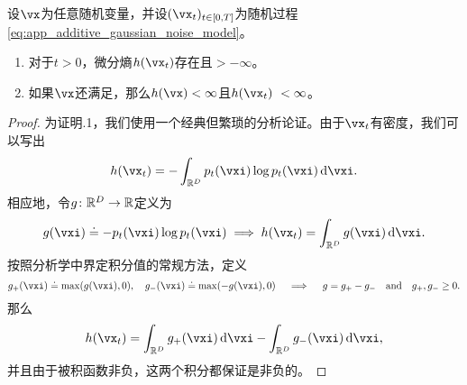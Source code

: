 \documentclass[../../book-main.tex]{subfiles}
\begin{document}
\begin{lemma}\label{lem:diffusion_entropy_exists}
    设\(\vx\)为任意随机变量，并设\((\vx_{t})_{t \in [0, T]}\)为随机过程\eqref{eq:app_additive_gaussian_noise_model}。
    \begin{enumerate}
        \item 对于\(t > 0\)，微分熵\(h(\vx_{t})\)存在且\(> -\infty\)。
        \item 如果\(\vx\)还满足，那么\(h(\vx) < \infty\)且\(h(\vx_{t})\ < \infty\)。
    \end{enumerate}
\end{lemma}
\begin{proof}
    为证明.1，我们使用一个经典但繁琐的分析论证。由于\(\vx_{t}\)有密度，我们可以写出
    \begin{equation}
        h(\vx_{t}) = -\int_{\R^{D}}p_{t}(\vxi)\log p_{t}(\vxi) \odif{\vxi}.
    \end{equation}
    相应地，令\(g \colon \mathbb{R}^{D} \to \mathbb{R}\)定义为
    \begin{equation}
        g(\vxi) \doteq -p_{t}(\vxi)\log p_{t}(\vxi) \implies h(\vx_{t}) = \int_{\R^{D}}g(\vxi)\odif{\vxi}.
    \end{equation}
    按照分析学中界定积分值的常规方法，定义
    \begin{equation}
        g_{+}(\vxi) \doteq \max(g(\vxi), 0), \quad g_{-}(\vxi) \doteq \max(-g(\vxi), 0) \quad \implies \quad g = g_{+} - g_{-}\quad \text{and} \quad g_{+}, g_{-} \geq 0.
    \end{equation}
    那么
    \begin{equation}
        h(\vx_{t}) = \int_{\R^{D}}g_{+}(\vxi)\odif{\vxi} - \int_{\R^{D}}g_{-}(\vxi)\odif{\vxi},
    \end{equation}
    并且由于被积函数非负，这两个积分都保证是非负的。
    

\end{proof}
\end{document}
